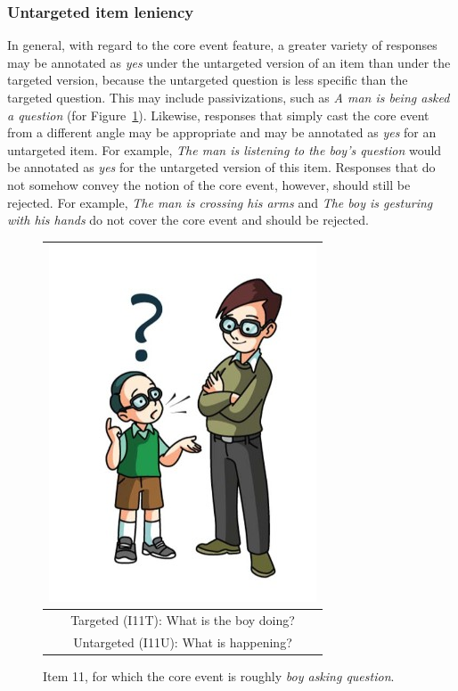 \documentclass[12pt]{article}
\begin{document}
\subsubsection{Untargeted item leniency} In general, with regard to the core event feature, a greater variety of responses may be annotated as \textit{yes} under the untargeted version of an item than under the targeted version, because the untargeted question is less specific than the targeted question. This may include passivizations, such as \textit{A man is being asked a question} (for Figure~\ref{fig:ask-question}). Likewise, responses that simply cast the core event from a different angle may be appropriate and may be annotated as \textit{yes} for an untargeted item. For example, \textit{The man is listening to the boy's question} would be annotated as \textit{yes} for the untargeted version of this item. Responses that do not somehow convey the notion of the core event, however, should still be rejected. For example, \textit{The man is crossing his arms} and \textit{The boy is gesturing with his hands} do not cover the core event and should be rejected.

\begin{figure}[h]
\begin{center}
\begin{tabular}{|c|}
\hline
\includegraphics[width=0.4\columnwidth,trim=0 0 0 -3]{figures/I11.jpg}\\
\hline
Targeted (I11T): What is the boy doing?\\
\hline
Untargeted (I11U): What is happening? \\
\hline
\end{tabular}
\end{center}
\caption{Item 11, for which the core event is roughly \textit{boy asking question}.}
\label{fig:ask-question}
\end{figure}
\end{document}
